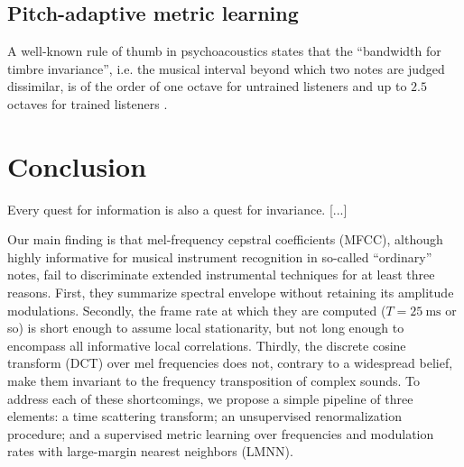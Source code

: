 \documentclass{article}
\makeatletter
\newcommand*{\ie}{i.e.\@\xspace}
\makeatother
\begin{document}
\subsection{Pitch-adaptive metric learning}
A well-known rule of thumb in psychoacoustics states that the ``bandwidth for timbre invariance'', \ie{} the musical interval beyond which two notes are judged dissimilar, is of the order of one octave for untrained listeners \cite{handel2001musicperception} and up to $2.5$ octaves for trained listeners \cite{steele2006musicperception}.




\section{Conclusion}
Every quest for information is also a quest for invariance. [...]

Our main finding is that mel-frequency cepstral coefficients (MFCC), although highly informative for musical instrument recognition in so-called ``ordinary'' notes, fail to discriminate extended instrumental techniques for at least three reasons.
First, they summarize spectral envelope without retaining its amplitude modulations.
Secondly, the frame rate at which they are computed ($T=\SI{25}{\milli\second}$ or so) is short enough to assume local stationarity, but not long enough to encompass all informative local correlations.
Thirdly, the discrete cosine transform (DCT) over mel frequencies does not, contrary to a widespread belief, make them invariant to the frequency transposition of complex sounds.
To address each of these shortcomings, we propose a simple pipeline of three elements: a time scattering transform; an unsupervised renormalization procedure; and a supervised metric learning over frequencies and modulation rates with large-margin nearest neighbors (LMNN).






\end{document}
